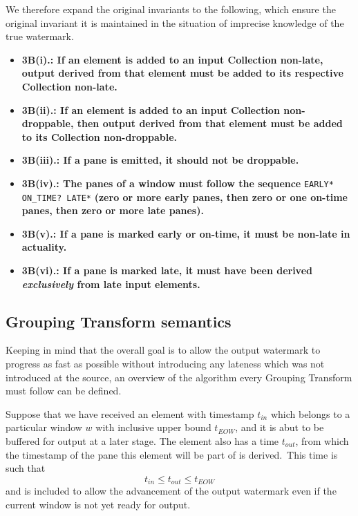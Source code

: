 We therefore expand the original invariants to the following, which ensure the original invariant it is maintained in the situation of imprecise knowledge of the true watermark.



\begin{itemize}
	\item \textbf{3B(i).: If an element is added to an input Collection non-late, output derived from that element must be added to its respective Collection non-late.}
	\item \textbf{3B(ii).: If an element is added to an input Collection non-droppable, then output derived from that element must be added to its Collection non-droppable.}
	\item \textbf{3B(iii).: If a pane is emitted, it should not be droppable.}
	\item\textbf{ 3B(iv).: The panes of a window must follow the sequence} \verb|EARLY* ON_TIME? LATE*| \textbf{(zero or more early panes, then zero or one on-time panes, then zero or more late panes).}
	\item \textbf{3B(v).: If a pane is marked early or on-time, it must be non-late in actuality.}
	\item \textbf{3B(vi).: If a pane is marked late, it must have been derived \emph{exclusively} from late input elements.}
\end{itemize}

\subsection{Grouping Transform semantics}\label{sec:impl:dataflow:grouping}


Keeping in mind that the overall goal is to allow the output watermark to progress as fast as possible without introducing any lateness which was not introduced at the source, an overview of the algorithm every Grouping Transform must follow can be defined.

Suppose that we have received an element with timestamp $t_{\mathit{in}}$ which belongs to a particular window $w$ with inclusive upper bound $t_{\mathit{EOW}}$, and it is abut to be buffered for output at a later stage.
The element also has a time $t_{\mathit{out}}$, from which the timestamp of the pane this element will be part of is derived.\footnotemark\ 
This time is such that \[t_{\mathit{in}} \leq t_{\mathit{out}} \leq t_{\mathit{EOW}}\] and is included to allow the advancement of the output watermark even if the current window is not yet ready for output.

